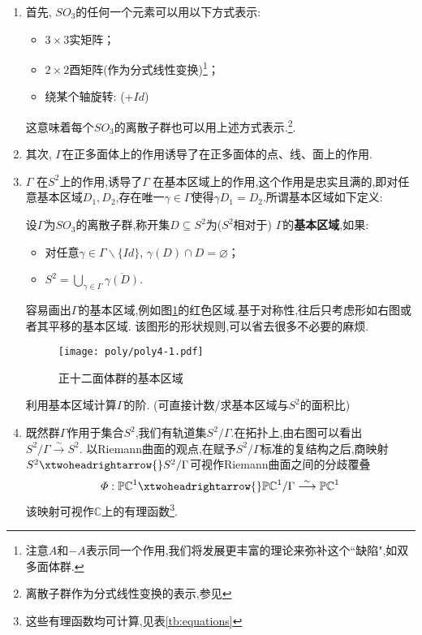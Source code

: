 		\begin{enumerate}
			\item 	首先, $SO_3$的任何一个元素可以用以下方式表示:
			\begin{itemize}
				\item 	$3\times3$实矩阵；
				\item 	$2\times2$酉矩阵(作为分式线性变换)\footnote{注意$A$和$-A$表示同一个作用,我们将发展更丰富的理论来弥补这个``缺陷",如双多面体群.}；
				\item 	绕某个轴旋转: (+$Id$)
			\end{itemize}
			这意味着每个$SO_3$的离散子群也可以用上述方式表示.\footnote{离散子群作为分式线性变换的表示,参见\cite[p46-47]{klein2003lectures}}.
			\item  其次, $\Gamma$在正多面体上的作用诱导了在正多面体的点、线、面上的作用.
			
			\item
			$\Gamma$ 在$S^2$上的作用,诱导了$\Gamma$ 在基本区域上的作用,这个作用是忠实且满的,即对任意基本区域$D_1,D_2$,存在唯一$\gamma\in\Gamma$使得$\gamma D_1=D_2$.所谓基本区域如下定义:
			\begin{defn}[基本区域]
				设$\Gamma$为$SO_3$的离散子群,称开集$D\subseteq S^2$为($S^2$相对于) $\Gamma$的\textbf{基本区域},如果:
				
				\begin{itemize}
					\item 对任意$\gamma\in\Gamma\smallsetminus\{Id\}$, $\gamma(D)\cap D=\varnothing$；
					
					\item $S^2=\bigcup_{\gamma\in\Gamma}\overline{\gamma(D)}$.
				\end{itemize}
			\end{defn}
		容易画出$\Gamma$的基本区域,例如图\ref{pic:basicdis}的红色区域.基于对称性,往后只考虑形如右图或者其平移的基本区域. 该图形的形状规则,可以省去很多不必要的麻烦.
			\begin{figure}[ht]
					\centering
					\texttt{[image: poly/poly4-1.pdf]}
					\caption{正十二面体群的基本区域}
					\label{pic:basicdis}
			\end{figure}
		\begin{exercise}
	利用基本区域计算$\Gamma$的阶. (可直接计数/求基本区域与$S^2$的面积比)
\end{exercise}

\item  既然群$\Gamma$作用于集合$S^2$,我们有轨道集$S^2/\Gamma$.在拓扑上,由右图可以看出$S^2/\Gamma\overset{\sim}{\longrightarrow}S^2$.
以Riemann曲面的观点,在赋予$S^2/\Gamma$标准的复结构之后,商映射$S^2\xtwoheadrightarrow{} S^2/\Gamma$可视作Riemann曲面之间的分歧覆叠
$$\varPhi:\mathbb{PC}^1\xtwoheadrightarrow{}\mathbb{PC}^1/\Gamma\overset{\sim}{\longrightarrow}\mathbb{PC}^1$$
该映射可视作$\mathbb{C}$上的有理函数\footnote{这些有理函数均可计算,见表\ref{tb:equations}}.
\begin{figure}[ht]
	

\end{figure}
\end{enumerate}
